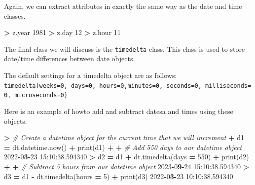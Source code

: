 \documentclass[
]{book}
\newenvironment{Shaded}{\begin{snugshade}}{\end{snugshade}}
\newcommand{\BuiltInTok}[1]{#1}
\newcommand{\CommentTok}[1]{\textcolor[rgb]{0.56,0.35,0.01}{\textit{#1}}}
\newcommand{\DecValTok}[1]{\textcolor[rgb]{0.00,0.00,0.81}{#1}}
\newcommand{\ErrorTok}[1]{\textcolor[rgb]{0.64,0.00,0.00}{\textbf{#1}}}
\newcommand{\FloatTok}[1]{\textcolor[rgb]{0.00,0.00,0.81}{#1}}
\newcommand{\NormalTok}[1]{#1}
\newcommand{\OperatorTok}[1]{\textcolor[rgb]{0.81,0.36,0.00}{\textbf{#1}}}
\begin{document}
Again, we can extract attributes in exactly the same way as the date and time classes.

\begin{Shaded}
\begin{Highlighting}[]
\OperatorTok{\textgreater{}}\NormalTok{ z.year}
\DecValTok{1981}
\OperatorTok{\textgreater{}}\NormalTok{ z.day}
\DecValTok{12}
\OperatorTok{\textgreater{}}\NormalTok{ z.hour}
\DecValTok{11}
\end{Highlighting}
\end{Shaded}

The final class we will discuss is the \texttt{timedelta} class. This class is used to store date/time differences between date objects.

The default settings for a timedelta object are as follows: \texttt{timedelta(weeks=0,\ days=0,\ hours=0,minutes=0,\ seconds=0,\ milliseconds=0,\ microseconds=0)}

Here is an example of howto add and subtract datesa and times using these objects.

\begin{Shaded}
\begin{Highlighting}[]
\OperatorTok{\textgreater{}} \CommentTok{\# Create a datetime object for the current time that we will increment}
\OperatorTok{+}\NormalTok{ d1 }\OperatorTok{=}\NormalTok{ dt.datetime.now()}
\OperatorTok{+} \BuiltInTok{print}\NormalTok{(d1)}
\OperatorTok{+} 
\OperatorTok{+} \CommentTok{\# Add 550 days to our datetime object }
\DecValTok{2022}\OperatorTok{{-}}\DecValTok{0}\ErrorTok{3}\OperatorTok{{-}}\DecValTok{23} \DecValTok{15}\NormalTok{:}\DecValTok{10}\NormalTok{:}\FloatTok{38.594340}
\OperatorTok{\textgreater{}}\NormalTok{ d2 }\OperatorTok{=}\NormalTok{ d1 }\OperatorTok{+}\NormalTok{ dt.timedelta(days }\OperatorTok{=} \DecValTok{550}\NormalTok{)}
\OperatorTok{+} \BuiltInTok{print}\NormalTok{(d2)}
\OperatorTok{+} 
\OperatorTok{+} \CommentTok{\# Subtract 5 hours from our datetime object }
\DecValTok{2023}\OperatorTok{{-}}\DecValTok{0}\ErrorTok{9}\OperatorTok{{-}}\DecValTok{24} \DecValTok{15}\NormalTok{:}\DecValTok{10}\NormalTok{:}\FloatTok{38.594340}
\OperatorTok{\textgreater{}}\NormalTok{ d3 }\OperatorTok{=}\NormalTok{ d1 }\OperatorTok{{-}}\NormalTok{ dt.timedelta(hours }\OperatorTok{=} \DecValTok{5}\NormalTok{)}
\OperatorTok{+} \BuiltInTok{print}\NormalTok{(d3)}
\DecValTok{2022}\OperatorTok{{-}}\DecValTok{0}\ErrorTok{3}\OperatorTok{{-}}\DecValTok{23} \DecValTok{10}\NormalTok{:}\DecValTok{10}\NormalTok{:}\FloatTok{38.594340}
\end{Highlighting}
\end{Shaded}
\end{document}
